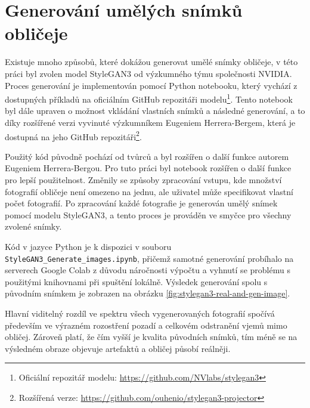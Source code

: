 \section{Generování umělých snímků obličeje}
\label{StyleGAN-implementation}

Existuje mnoho způsobů, které dokážou generovat umělé snímky obličeje, v této práci byl zvolen model StyleGAN3 \cite{karras2021alias} od výzkumného týmu společnosti NVIDIA. Proces generování je implementován pomocí Python notebooku, který vychází z dostupných příkladů na oficiálním GitHub repozitáři modelu\footnote{Oficiální repozitář modelu: \url{https://github.com/NVlabs/stylegan3}}. Tento notebook byl dále upraven o možnost vkládání vlastních snímků a následné generování, a to díky rozšířené verzi vyvinuté výzkumníkem Eugeniem Herrera-Bergem, která je dostupná na jeho GitHub repozitáři\footnote{Rozšířená verze: \url{https://github.com/ouhenio/stylegan3-projector}}.

Použitý kód původně pochází od tvůrců a byl rozšířen o další funkce autorem Eugeniem Herrera-Bergou. Pro tuto práci byl notebook rozšířen o další funkce pro lepší použitelnost. Změnily se způsoby zpracování vstupu, kde množství fotografií obličeje není omezeno na jednu, ale uživatel může specifikovat vlastní počet fotografií. Po zpracování každé fotografie je generován umělý snímek pomocí modelu StyleGAN3, a tento proces je prováděn ve smyčce pro všechny zvolené snímky.

Kód v jazyce Python je k dispozici v souboru \texttt{StyleGAN3\_Generate\_images.ipynb}, přičemž samotné generování probíhalo na serverech Google Colab z důvodu náročnosti výpočtu a vyhnutí se problému s použitými knihovnami při spuštění lokálně. Výsledek generování spolu s původním snímkem je zobrazen na obrázku \ref{fig:stylegan3-real-and-gen-image}.

Hlavní viditelný rozdíl ve spektru všech vygenerovaných fotografií spočívá především ve výrazném rozostření pozadí a celkovém odstranění vjemů mimo obličej. Zároveň platí, že čím vyšší je kvalita původních snímků, tím méně se na výsledném obraze objevuje artefaktů a obličej působí reálněji.

